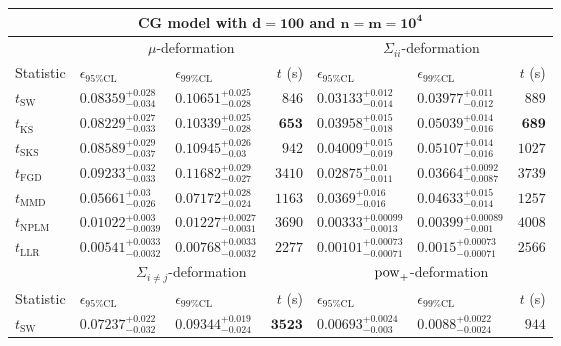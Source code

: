 \begin{tabular}{l|llr|llr}
	\toprule
	\multicolumn{7}{c}{{\bf CG model with $\mathbf{d=100}$ and $\mathbf{n=m=10^{4}}$}} \\
	\toprule
	\multicolumn{1}{c}{} & \multicolumn{3}{c}{$\mu$-deformation} & \multicolumn{3}{c}{$\Sigma_{ii}$-deformation} \\
	Statistic & $\epsilon_{95\%\mathrm{CL}}$ & $\epsilon_{99\%\mathrm{CL}}$ & $t$ (s) & $\epsilon_{95\%\mathrm{CL}}$ & $\epsilon_{99\%\mathrm{CL}}$ & $t$ (s) \\
	\midrule
	$t_{\mathrm{SW}}$ & $0.08359_{-0.034}^{+0.028}$ & $0.10651_{-0.028}^{+0.025}$ & $846$ & $0.03133_{-0.014}^{+0.012}$ & $0.03977_{-0.012}^{+0.011}$ & $889$ \\
	$t_{\overline{\mathrm{KS}}}$ & $0.08229_{-0.033}^{+0.027}$ & $0.10339_{-0.028}^{+0.025}$ & ${\mathbf{653}}$ & $0.03958_{-0.018}^{+0.015}$ & $0.05039_{-0.016}^{+0.014}$ & ${\mathbf{689}}$ \\
	$t_{\mathrm{SKS}}$ & $0.08589_{-0.037}^{+0.029}$ & $0.10945_{-0.03}^{+0.026}$ & $942$ & $0.04009_{-0.019}^{+0.015}$ & $0.05107_{-0.016}^{+0.014}$ & $1027$ \\
	$t_{\mathrm{FGD}}$ & $0.09233_{-0.033}^{+0.032}$ & $0.11682_{-0.027}^{+0.029}$ & $3410$ & ${\mathbf{0.02875_{-0.011}^{+0.01}}}$ & ${\mathbf{0.03664_{-0.0087}^{+0.0092}}}$ & $3739$ \\
	$t_{\mathrm{MMD}}$ & ${\mathbf{0.05661_{-0.026}^{+0.03}}}$ & ${\mathbf{0.07172_{-0.024}^{+0.028}}}$ & $1163$ & $0.0369_{-0.016}^{+0.016}$ & $0.04633_{-0.014}^{+0.015}$ & $1257$ \\
\rowcolor{red!35}	$t_{\mathrm{NPLM}}$ & $0.01022_{-0.0039}^{+0.003}$ & $0.01227_{-0.0031}^{+0.0027}$ & $3690$ & $0.00333_{-0.0013}^{+0.00099}$ & $0.00399_{-0.001}^{+0.00089}$ & $4008$ \\
	$t_{\mathrm{LLR}}$ & $0.00541_{-0.0032}^{+0.0033}$ & $0.00768_{-0.0032}^{+0.0033}$ & $2277$ & $0.00101_{-0.00071}^{+0.00073}$ & $0.0015_{-0.00071}^{+0.00073}$ & $2566$ \\
	\toprule
	\multicolumn{1}{c}{} & \multicolumn{3}{c}{$\Sigma_{i\neq j}$-deformation} & \multicolumn{3}{c}{$\rm{pow}_{+}$-deformation} \\
	Statistic & $\epsilon_{95\%\mathrm{CL}}$ & $\epsilon_{99\%\mathrm{CL}}$ & $t$ (s) & $\epsilon_{95\%\mathrm{CL}}$ & $\epsilon_{99\%\mathrm{CL}}$ & $t$ (s) \\
	\midrule
	$t_{\mathrm{SW}}$ & $0.07237_{-0.032}^{+0.022}$ & $0.09344_{-0.024}^{+0.019}$ & ${\mathbf{3523}}$ & $0.00693_{-0.003}^{+0.0024}$ & $0.0088_{-0.0024}^{+0.0022}$ & $944$ \\

\end{tabular}
